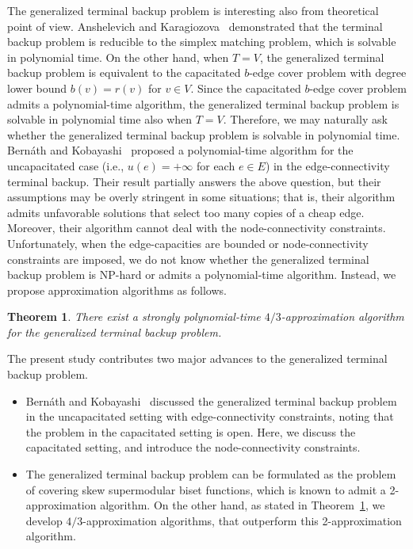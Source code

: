 \documentclass{article}
\newtheorem{theorem}{Theorem}
\begin{document}
The generalized terminal backup problem is interesting also from theoretical point of view.
Anshelevich and Karagiozova~\cite{AnshelevichK11} demonstrated
that the terminal backup problem is reducible to the simplex
matching problem, which is solvable in polynomial time. 
On the other hand, when $T=V$, the generalized terminal backup problem is equivalent to the capacitated 
$b$-edge cover problem with degree lower
bound $b(v)=r(v)$ for $v \in V$. Since the capacitated 
$b$-edge cover problem admits a polynomial-time algorithm, the
generalized terminal backup problem is solvable in polynomial time also when $T=V$. 
Therefore, we may naturally ask whether the generalized terminal backup
problem is solvable in polynomial time. Bern{\'a}th and Kobayashi~\cite{Bernath2014} proposed a
polynomial-time algorithm for the uncapacitated case (i.e., $u(e)=+\infty$ for each $e \in E$)
in the edge-connectivity terminal backup. Their result partially
answers the above question, but their assumptions may be overly stringent in some situations;
that is, their algorithm admits unfavorable solutions that select too many copies of a cheap edge. 
Moreover, their algorithm cannot deal with the node-connectivity constraints.
Unfortunately, 
when the edge-capacities are bounded or node-connectivity constraints
are imposed,
we do not know whether
the generalized terminal backup problem is NP-hard or admits a
polynomial-time algorithm.
Instead, we propose approximation algorithms as follows.

\begin{theorem}\label{thm:main-4/3}
There exist a strongly polynomial-time $4/3$-approximation algorithm for
the generalized terminal backup problem.
\end{theorem}


The present study contributes two major advances
to the generalized terminal backup problem.
\begin{itemize}
	\item Bern{\'a}th and Kobayashi~\cite{Bernath2014} discussed the 
	generalized terminal backup problem 
	in the uncapacitated setting
	with edge-connectivity constraints, noting that 
	the problem in the capacitated setting is open.
	Here, we discuss the capacitated setting, and 
	introduce the node-connectivity constraints.
	\item The generalized
	terminal backup problem can be formulated as the problem of covering skew
	supermodular biset functions, which is known to admit a 2-approximation algorithm.
	On the other hand, as stated in Theorem~\ref{thm:main-4/3}, we develop 
	$4/3$-approximation algorithms, that outperform this 2-approximation algorithm.
\end{itemize}
\end{document}
